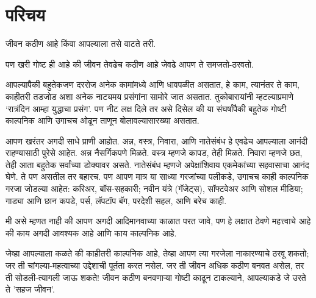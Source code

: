 \chapter{परिचय}

जीवन कठीण आहे किंवा आपल्याला तसे वाटते तरी. 

पण खरी गोष्ट ही आहे की जीवन तेवढेच कठीण आहे जेवढे आपण ते समजतो-ठरवतो.

आपल्यापैकी बहुतेकजण दररोज अनेक कामांमध्ये आणि धावपळीत असतात, हे काम, त्यानंतर ते काम, काहीतरी  तडजोड अशा अनेक नाट्यमय प्रसंगांना सामोरे जात असतात. तुकोबारायांनी म्हटल्याप्रमाणे ‘रात्रंदिन आम्हा युद्धाचा प्रसंग’. पण नीट लक्ष दिले तर असे दिसेल की या संघर्षांपैकी बहुतेक गोष्टी काल्पनिक आणि उगाचच ओढून ताणून बोलावल्यासारख्या असतात.

आपण खरंतर अगदी साधे प्राणी आहोत. अन्न, वस्त्र, निवारा, आणि नातेसंबंध हे एवढेच आपल्याला आनंदी राहण्यासाठी पुरेसे आहेत. अन्न  नैसर्गिकपणे मिळते. वस्त्र म्हणजे कापड, तेही मिळते. निवारा म्हणजे छत, तेही आता बहुतेक सर्वांच्या डोक्यावर असते. नातेसंबंध म्हणजे अपेक्षांशिवाय एकमेकांच्या सहवासाचा आनंद घेणे. ते पण असतील तर बहारच. पण आपण मात्र या साध्या गरजांच्या पलीकडे, उगाचच काही काल्पनिक गरजा जोडल्या आहेत: करिअर, बॉस-सहकारी; नवीन यंत्रे (गॅजेट्स), सॉफ्टवेअर आणि सोशल मीडिया; गाड्या आणि छान कपडे, पर्स, लॅपटॉप बॅग, परदेशी सहल, आणि बरेच काही. 

मी असे म्हणत नाही की आपण अगदी आदिमानवाच्या काळात परत जावे, पण हे लक्षात ठेवणे महत्त्वाचे आहे की काय अगदी आवश्यक आहे आणि काय काल्पनिक आहे.

जेव्हा आपल्याला कळते की काहीतरी काल्पनिक आहे, तेव्हा आपण त्या गरजेला नाकारण्याचे ठरवू शकतो; जर ती चांगल्या-महत्वाच्या  उद्देशाची पूर्तता करत नसेल. जर ती जीवन अधिक कठीण बनवत असेल, तर ती सोडली-त्यागली जाऊ शकते! जीवन कठीण बनवणाऱ्या गोष्टी काढून टाकल्याने, आपल्याकडे जे उरते ते 'सहज जीवन'.

